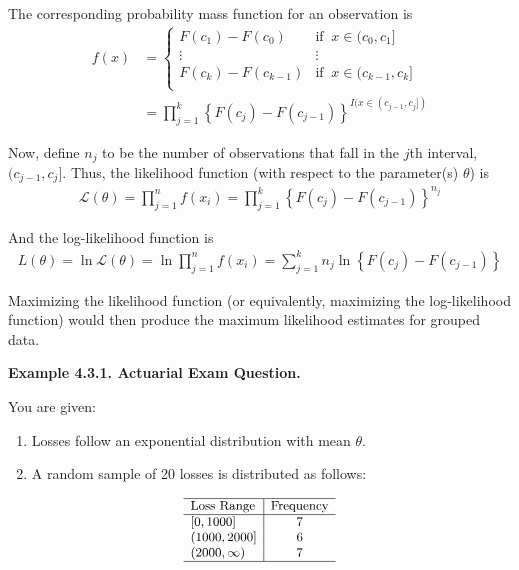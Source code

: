 \documentclass[]{book}
\providecommand{\tightlist}{%
  \setlength{\itemsep}{0pt}\setlength{\parskip}{0pt}}
\theoremstyle{definition}
\theoremstyle{definition}
\theoremstyle{definition}
\theoremstyle{remark}
\begin{document}
The corresponding probability mass function for an observation is
\[\begin{aligned}
f(x) &=
\begin{cases}
F(c_1) - F(c_{0}) &   \text{if }\ x \in (c_{0}, c_1]\\
\vdots & \vdots \\
F(c_k) - F(c_{k-1}) &   \text{if }\ x \in (c_{k-1}, c_k]\\
\end{cases} \\
&= \prod_{j=1}^k \left\{F(c_j) - F(c_{j-1})\right\}^{I(x \in (c_{j-1}, c_j])}
\end{aligned}\]

Now, define \(n_j\) to be the number of observations that fall in the
\(j\)th interval, \((c_{j-1}, c_j]\). Thus, the likelihood function
(with respect to the parameter(s) \(\theta\)) is \[\begin{aligned}
\mathcal{L}(\theta) = \prod_{j=1}^n f(x_i) = \prod_{j=1}^k \left\{F(c_j) - F(c_{j-1})\right\}^{n_j}
\end{aligned}\]

And the log-likelihood function is \[\begin{aligned}
L(\theta) = \ln \mathcal{L}(\theta) = \ln \prod_{j=1}^n f(x_i) = \sum_{j=1}^k n_j \ln \left\{F(c_j) - F(c_{j-1})\right\}
\end{aligned}\]

Maximizing the likelihood function (or equivalently, maximizing the
log-likelihood function) would then produce the maximum likelihood
estimates for grouped data.

\textbf{Example 4.3.1. Actuarial Exam Question.}

You are given:

\begin{enumerate}
\def\labelenumi{(\roman{enumi})}
\tightlist
\item
  Losses follow an exponential distribution with mean \(\theta\).
\item
  A random sample of 20 losses is distributed as follows:
\end{enumerate}

\[
{\small
\begin{array}{l|c}
\hline
\text{Loss Range} & \text{Frequency} \\
\hline
[0,1000] & 7 \\
(1000,2000] & 6 \\
(2000,\infty) & 7 \\
\hline
\end{array}
}
\]
\end{document}
